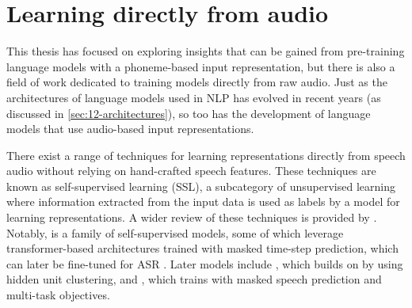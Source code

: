 

\section{Learning directly from audio}
\label{sec:17-audiomodels}

This thesis has focused on exploring insights that can be gained from pre-training language models with a phoneme-based input representation, but there is also a field of work dedicated to training models directly from raw audio. Just as the architectures of language models used in NLP has evolved in recent years (as discussed in \cref{sec:12-architectures}), so too has the development of language models that use audio-based input representations.

There exist a range of techniques for learning representations directly from speech audio without relying on hand-crafted speech features. These techniques are known as self-supervised learning (SSL), a subcategory of unsupervised learning where information extracted from the input data is used as labels by a model for learning representations. A wider review of these techniques is provided by \citet{mohamed2022self}. Notably,  is a family of self-supervised models, some of which leverage transformer-based architectures trained with masked time-step prediction, which can later be fine-tuned for ASR \citep{baevski2020wav2vec}. Later models include  \citep{hsu-2021-hubert}, which builds on  by using hidden unit clustering, and  \citep{chen2022wavlm}, which trains with masked speech prediction and multi-task objectives.

